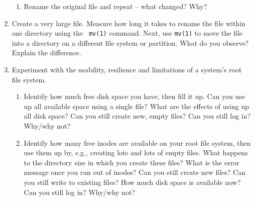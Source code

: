 \begin{enumerate}
\begin{enumerate}
\item
Rename the original file and repeat -- what changed?  Why?
\end{enumerate}

\item

Create a very large file.  Measure how long it takes
to rename the file within one directory using the {\tt
mv(1)} command.  Next, use {\tt mv(1)} to move the
file into a directory on a different file system or
partition.  What do you observe?  Explain the
difference.

\item
Experiment with the usability, resilience and
limitations of a system's root file system.

\begin{enumerate}

\item
Identify how much free disk space you have, then fill
it up.  Can you use up all available space using a
single file?  What are the effects of using up all
disk space?  Can you still create new, empty files?
Can you still log in?  Why/why not?

\item
Identify how many free inodes are available on your
root file system, then use them up by, e.g., creating
lots and lots of empty files.  What happens to the
directory size in which you create these files?  What
is the error message once you run out of inodes?  Can
you still create new files?  Can you still write to
existing files?  How much disk space is available now?
Can you still log in?  Why/why not?

\end{enumerate}


\end{enumerate}

\pagebreak

